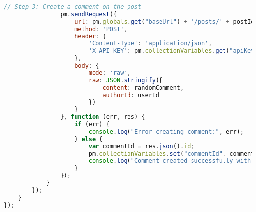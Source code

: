 \begin{lstlisting}[language=JavaScript, caption={Pre-Request Skript für die Erstellung eines Benutzers, Posts und Kommentars}, label={lst:pre-request-script-200}]
                // Step 3: Create a comment on the post
                pm.sendRequest({
                    url: pm.globals.get("baseUrl") + '/posts/' + postId + '/comments',
                    method: 'POST',
                    header: {
                        'Content-Type': 'application/json',
                        'X-API-KEY': pm.collectionVariables.get("apiKey")
                    },
                    body: {
                        mode: 'raw',
                        raw: JSON.stringify({
                            content: randomComment,
                            authorId: userId
                        })
                    }
                }, function (err, res) {
                    if (err) {
                        console.log("Error creating comment:", err);
                    } else {
                        var commentId = res.json().id;
                        pm.collectionVariables.set("commentId", commentId);
                        console.log("Comment created successfully with ID:", commentId);
                    }
                });
            }
        });
    }
});
\end{lstlisting}
